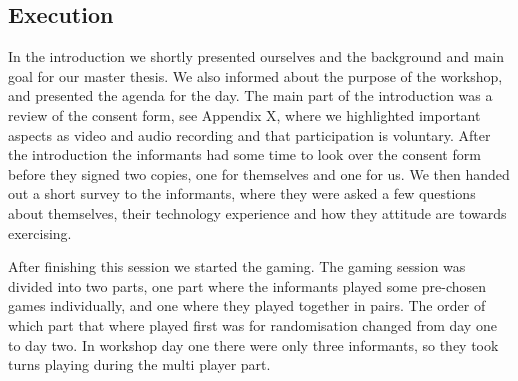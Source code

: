 \subsection{Execution}
In the introduction we shortly presented ourselves and the background and main goal for our master thesis. We also informed about the purpose of the workshop, and presented the agenda for the day. The main part of the introduction was a review of the consent form, see Appendix X, where we highlighted important aspects as video and audio recording and that participation is voluntary. After the introduction the informants had some time to look over the consent form before they signed two copies, one for themselves and one for us. We then handed out a short survey to the informants, where they were asked a few questions about themselves, their technology experience and how they attitude are towards exercising. 

After finishing this session we started the gaming. The gaming session was divided into two parts, one part where the informants played some pre-chosen games individually, and one where they played together in pairs. The order of which part that where played first was for randomisation changed from day one to day two. In workshop day one there were only three informants, so they took turns playing during the multi player part. 

